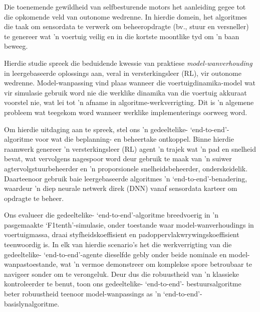 Die toenemende gewildheid van selfbesturende motors het aanleiding gegee tot die opkomende veld van outonome wedrenne.
In hierdie domein, het algoritmes die taak om sensordata te verwerk om beheeropdragte (bv., stuur en versneller) te genereer wat 'n voertuig veilig en in die kortste moontlike tyd om 'n baan beweeg.

Hierdie studie spreek die beduidende kwessie van praktiese \emph{model-wanverhouding} in leergebaseerde oplossings aan, veral in versterkingsleer (RL), vir outonome wedrenne.
Model-wanpassing vind plaas wanneer die voertuigdinamika-model wat vir simulasie gebruik word nie die werklike dinamika van die voertuig akkuraat voorstel nie, wat lei tot 'n afname in algoritme-werkverrigting.
Dit is 'n algemene probleem wat teegekom word wanneer werklike implementerings oorweeg word.

Om hierdie uitdaging aan te spreek, stel ons 'n gedeeltelike- `end-to-end'-algoritme voor wat die beplanning- en beheertake ontkoppel.
Binne hierdie raamwerk genereer 'n versterkingsleer (RL) agent 'n trajek wat 'n pad en snelheid bevat, wat vervolgens nagespoor word deur gebruik te maak van 'n suiwer agtervolgstuurbeheerder en 'n proporsionele snelheidsbeheerder, onderskeidelik.
Daarteenoor gebruik baie leergebaseerde algoritmes 'n `end-to-end'-benadering, waardeur 'n diep neurale netwerk direk (DNN) vanaf sensordata karteer om opdragte te beheer.

Ons evalueer die gedeeltelike- `end-to-end'-algoritme breedvoerig in 'n pasgemaakte `F1tenth'-simulasie, onder toestande waar model-wanverhoudings in voertuigmassa, draai styfheidskoeffisient en padoppervlakwrywingskoeffisient teenwoordig is.
In elk van hierdie scenario's het die werkverrigting van die gedeeltelike- `end-to-end'-agente dieselfde gebly onder beide nominale en model-wanpastoestande, wat 'n vermoe demonstreer om komplekse spore betroubaar te navigeer sonder om te verongeluk.
Deur dus die robuustheid van 'n klassieke kontroleerder te benut, toon ons gedeeltelike- `end-to-end'- bestuursalgoritme beter robuustheid teenoor model-wanpassings as 'n `end-to-end'- basislynalgoritme.




